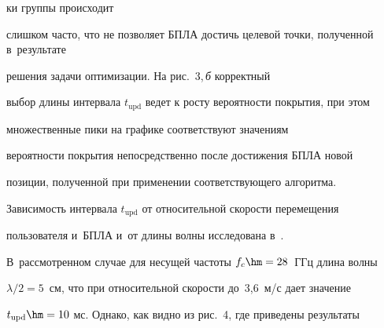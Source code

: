 

  


\noindent  


ки группы происходит 


слишком час\-то, что не позволяет БПЛА достичь целевой точки, полученной в~результате 


решения задачи оптимизации. На рис.~3,\,\textit{б} корректный 


выбор длины интервала $t_{\mathrm{upd}}$ ведет к росту вероятности покрытия, при этом 


множественные пики на графике соответствуют зна\-че\-ни\-ям 


вероятности покрытия непосредственно после достижения БПЛА новой 


позиции, полученной при применении соответствующего алгоритма.


 


  Зависимость интервала $t_{\mathrm{upd}}$ от относительной скорости перемещения 


пользователя и~БПЛА и~от длины волны исследована в~\cite{17-md}. 


В~рассмотренном случае для несущей частоты $f_c \hm=28$~ГГц длина волны 


$\lambda/2=5$~см, что при относительной ско\-рости до~3,6~м/с дает значение 


$t_{\mathrm{upd}}\hm=10$ мс. Однако, как видно из рис.~4, где приведены результаты 


